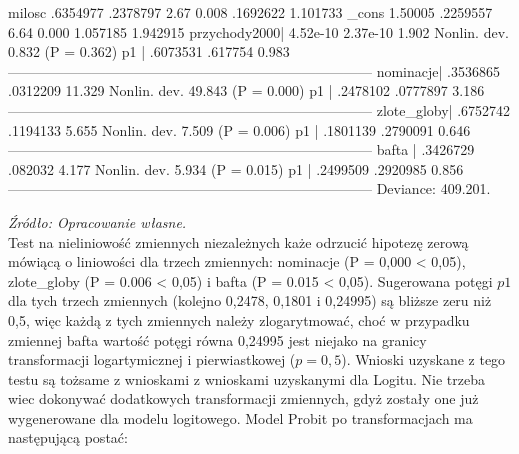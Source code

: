 \begin{stlog}
      milosc {\VBAR}   .6354977   .2378797     2.67   0.008     .1692622    1.101733
       _cons {\VBAR}    1.50005   .2259557     6.64   0.000     1.057185    1.942915
przychody2000| 4.52e-10   2.37e-10      1.902 Nonlin. dev. 0.832   (P = 0.362)
      p1 |   .6073531    .617754      0.983
------------------------------------------------------------------------------
nominacje|   .3536865   .0312209     11.329   Nonlin. dev. 49.843  (P = 0.000)
      p1 |   .2478102   .0777897      3.186
------------------------------------------------------------------------------
zlote_globy| .6752742   .1194133      5.655   Nonlin. dev. 7.509   (P = 0.006)
      p1 |   .1801139   .2790091      0.646
------------------------------------------------------------------------------
bafta    |   .3426729    .082032      4.177   Nonlin. dev. 5.934   (P = 0.015)
      p1 |   .2499509   .2920985      0.856
------------------------------------------------------------------------------
Deviance:  409.201.
\end{stlog}
\textit{\footnotesize{Źródło: Opracowanie własne.}} \\

Test na nieliniowość zmiennych niezależnych każe odrzucić hipotezę zerową mówiącą o liniowości dla trzech zmiennych: nominacje (P = 0,000 < 0,05), zlote_globy (P = 0.006 < 0,05) i bafta (P = 0.015 < 0,05). Sugerowana potęgi $p1$ dla tych trzech zmiennych (kolejno 0,2478, 0,1801 i 0,24995) są bliższe zeru niż 0,5, więc każdą z tych zmiennych należy zlogarytmować, choć w przypadku zmiennej bafta wartość potęgi równa 0,24995 jest niejako na granicy transformacji logartymicznej i pierwiastkowej ($p=0,5$). Wnioski uzyskane z tego testu są tożsame z wnioskami z wnioskami uzyskanymi dla Logitu. Nie trzeba wiec dokonywać dodatkowych transformacji zmiennych, gdyż zostały one już wygenerowane dla modelu logitowego. Model Probit po transformacjach ma następującą postać:

